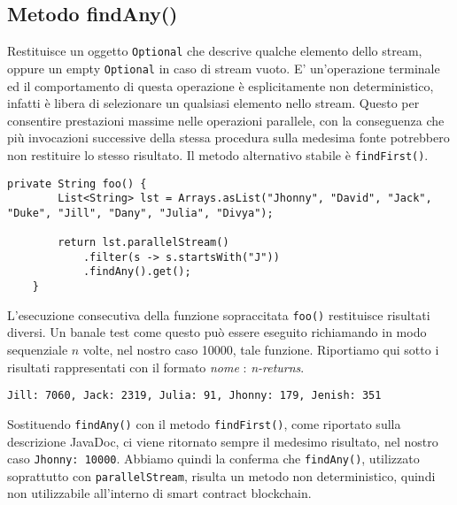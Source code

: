 		\subsection{Metodo findAny()}
			Restituisce un oggetto \lstinline|Optional| che descrive qualche elemento dello stream, oppure un empty \lstinline|Optional| in caso di stream vuoto. E' un'operazione terminale ed il comportamento di questa operazione è esplicitamente non deterministico, infatti è libera di selezionare un qualsiasi elemento nello stream. Questo per consentire prestazioni massime nelle operazioni parallele, con la conseguenza che più invocazioni successive della stessa procedura sulla medesima fonte potrebbero non restituire lo stesso risultato. Il metodo alternativo stabile è \lstinline|findFirst()|.
			\begin{lstlisting}[breaklines=true]
	private String foo() {
		List<String> lst = Arrays.asList("Jhonny", "David", "Jack", "Duke", "Jill", "Dany", "Julia", "Divya");
		
		return lst.parallelStream()
			.filter(s -> s.startsWith("J"))
			.findAny().get();
	}
			\end{lstlisting}
			L'esecuzione consecutiva della funzione sopraccitata \lstinline|foo()| restituisce risultati diversi. Un banale test come questo può essere eseguito richiamando in modo sequenziale $n$ volte, nel nostro caso 10000, tale funzione. Riportiamo qui sotto i risultati rappresentati con il formato \textit{nome} : \textit{n-returns}.
			\begin{lstlisting}[numbers=none,frame=none]
	Jill: 7060, Jack: 2319, Julia: 91, Jhonny: 179, Jenish: 351
			\end{lstlisting}
			Sostituendo \lstinline|findAny()| con il metodo \lstinline|findFirst()|, come riportato sulla descrizione JavaDoc, ci viene ritornato sempre il medesimo risultato, nel nostro caso \lstinline|Jhonny: 10000|.
			Abbiamo quindi la conferma che \lstinline|findAny()|, utilizzato soprattutto con \lstinline|parallelStream|, risulta un metodo non deterministico, quindi non utilizzabile all'interno di smart contract blockchain.
			
